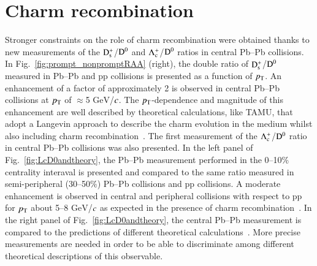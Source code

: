 \documentclass[3p,times,procedia]{elsarticle}
\newcommand{\GeV}{\mathrm{GeV}}
\newcommand{\pt}{p_{\rm T}}
\newcommand{\Dzero}{{\rm D^0}}
\newcommand{\Ds}{{\rm D_{s}^+}}
\newcommand{\Lc}{{\rm \Lambda_{c}^+}}
\begin{document}
\section{Charm recombination}
\label{recombination}
Stronger constraints on the role of charm recombination were obtained thanks to new measurements of the $\Ds$/$\Dzero$ and $\Lc$/$\Dzero$ ratios
in central Pb--Pb collisions. In Fig.~\ref{fig:prompt_nonpromptRAA} (right), the double ratio of $\Ds$/$\Dzero$ measured in Pb--Pb and pp collisions 
is presented as a function of $\pt$. An enhancement of a factor of approximately 2 is observed in central Pb--Pb collisions at $\pt$ of $\approx$5 
$\GeV$/$\it{c}$. The $\pt$-dependence and magnitude 
of this enhancement are well described by theoretical calculations, like TAMU, that adopt a Langevin approach to describe the charm evolution in the 
medium whilst also including charm recombination~\cite{tamu}. The first measurement of the $\Lc$/$\Dzero$ ratio in central Pb--Pb collisions was also presented. 
In the left panel of Fig.~\ref{fig:LcD0andtheory}, the Pb--Pb measurement performed in the 0--10$\%$ centrality interaval
is presented and compared to the same ratio measured in semi-peripheral (30--50$\%$) Pb--Pb collisions and pp collisions. 
A moderate enhancement is observed in central and
peripheral collisions with respect to pp for $\pt$ about 5--8 $\GeV$/$\it{c}$ as expected in the presence of charm recombination~\cite{tamu}. 
In the right panel of Fig.~\ref{fig:LcD0andtheory}, the central Pb--Pb measurement is compared to the predictions of
different theoretical calculations~\cite{catania,shm,pythia8}.
More precise measurements are needed in order to be able to discriminate among different theoretical descriptions of this observable.
\end{document}
